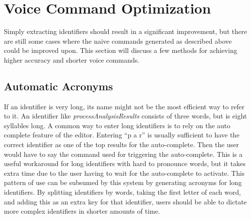 \documentclass[../thesis.tex]{subfiles}
\begin{document}


\section{Voice Command Optimization}
Simply extracting identifiers should result in a significant improvement, but there are still some cases
where the naive commands generated as described above could be improved upon.
This section will discuss a few methods for achieving higher accuracy and shorter voice commands.

\subsection{Automatic Acronyms}\label{automatic_acronyms}
If an identifier is very long, its name might not be the most efficient way to refer to it.
An identifier like \textit{processAnalysisResults} consists of three words, but is eight syllables long.
A common way to enter long identifiers is to rely on the auto complete feature of the editor.
Entering ``p a r'' is usually sufficient to have the correct identifier as one of the top results for the auto-complete.
Then the user would have to say the command used for triggering the auto-complete.
This is a useful workaround for long identifiers with hard to pronounce words, but it takes extra time
due to the user having to wait for the auto-complete to activate.
This pattern of use can be subsumed by this system by generating acronyms for long identifiers.
By splitting identifiers by words, taking the first letter of each word, and adding this as an extra key
for that identifier, users should be able to dictate more complex identifiers in shorter amounts of time.
\end{document}
